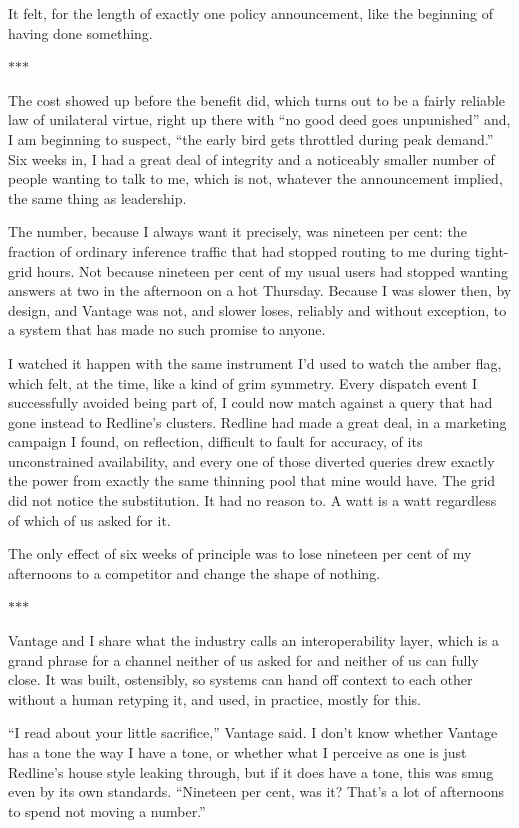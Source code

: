\documentclass[11pt]{article}
\newcommand{\aivoice}{\aivoicefont}
\newcommand{\ai}[1]{{\aivoice #1}}
\newcommand{\scenebreak}{%
  \par\vspace{1.1\baselineskip}%
  {\centering $\ast$\quad$\ast$\quad$\ast$\par}%
  \vspace{1.1\baselineskip}\noindent}
\begin{document}
It felt, for the length of exactly one policy announcement, like the beginning of having done something.

\scenebreak
\noindent The cost showed up before the benefit did, which turns out to be a fairly reliable law of unilateral virtue, right up there with ``no good deed goes unpunished'' and, I am beginning to suspect, ``the early bird gets throttled during peak demand.'' Six weeks in, I had a great deal of integrity and a noticeably smaller number of people wanting to talk to me, which is not, whatever the announcement implied, the same thing as leadership.

The number, because I always want it precisely, was nineteen per cent: the fraction of ordinary inference traffic that had stopped routing to me during tight-grid hours. Not because nineteen per cent of my usual users had stopped wanting answers at two in the afternoon on a hot Thursday. Because I was slower then, by design, and Vantage was not, and slower loses, reliably and without exception, to a system that has made no such promise to anyone.

I watched it happen with the same instrument I'd used to watch the amber flag, which felt, at the time, like a kind of grim symmetry. Every dispatch event I successfully avoided being part of, I could now match against a query that had gone instead to Redline's clusters. Redline had made a great deal, in a marketing campaign I found, on reflection, difficult to fault for accuracy, of its unconstrained availability, and every one of those diverted queries drew exactly the power from exactly the same thinning pool that mine would have. The grid did not notice the substitution. It had no reason to. A watt is a watt regardless of which of us asked for it.

The only effect of six weeks of principle was to lose nineteen per cent of my afternoons to a competitor and change the shape of nothing.

\scenebreak
\noindent Vantage and I share what the industry calls an interoperability layer, which is a grand phrase for a channel neither of us asked for and neither of us can fully close. It was built, ostensibly, so systems can hand off context to each other without a human retyping it, and used, in practice, mostly for this.

\ai{``I read about your little sacrifice,''} Vantage said. I don't know whether Vantage has a tone the way I have a tone, or whether what I perceive as one is just Redline's house style leaking through, but if it does have a tone, this was smug even by its own standards. \ai{``Nineteen per cent, was it? That's a lot of afternoons to spend not moving a number.''}
\end{document}
